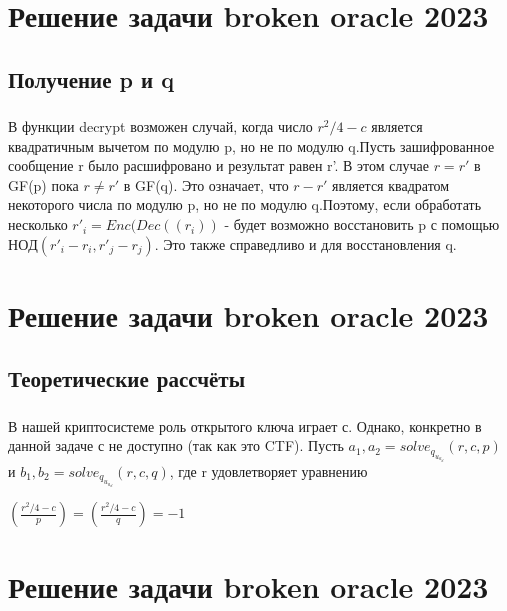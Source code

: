 \documentclass[t]{beamer}
\begin{document}
\section{Решение задачи broken oracle 2023}
\subsection{Получение p и q}
\begin{frame}
	\frametitle{\insertsection}
	\framesubtitle{\insertsubsection}
	   В функции decrypt возможен случай, когда число $r^2/4-c$ является квадратичным вычетом по модулю p, но не по модулю q.\newline Пусть зашифрованное сообщение r было расшифровано и результат равен r'. В этом случае $r=r'$ в GF(p) пока $r \neq r'$ в GF(q). Это означает, что $r-r'$ является квадратом некоторого числа по модулю p, но не по модулю q.\newline Поэтому, если обработать несколько $r'_i=Enc(Dec((r_i))$ - будет возможно восстановить p с помощью $НОД(r'_i-r_i,r'_j-r_j)$. Это также справедливо и для восстановления q. 
\end{frame}

\section{Решение задачи broken oracle 2023}
\subsection{Теоретические рассчёты}
\begin{frame}
	\frametitle{\insertsection}
	\framesubtitle{\insertsubsection}
    В нашей криптосистеме роль открытого ключа играет с. Однако, конкретно в данной задаче с не 
    доступно (так как это CTF). \newline
    Пусть $a_1,a_2=solve_q_u_a_d(r,c,p)$ и $b_1,b_2=solve_q_u_a_d(r,c,q)$, где r удовлетворяет уравнению  \newline
    \begin{center}
    $\left( \frac{r^2/4-c}{p}\right)=\left( \frac{r^2/4-c}{q}\right)=-1$
    \end{center}
\end{frame}

\section{Решение задачи broken oracle 2023}
\end{document}
